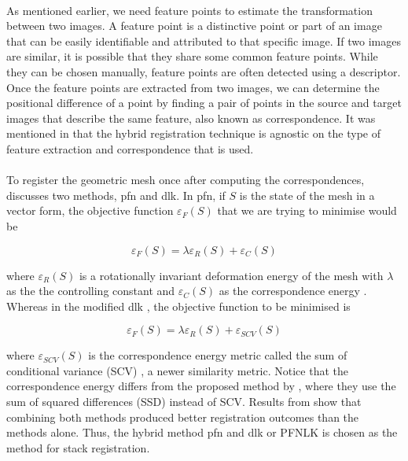 \documentclass[12pt,oneside]{report}
\begin{document}
\paragraph{}
As mentioned earlier, we need feature points to estimate the transformation between two images. A feature point is a distinctive point or part of an image that can be easily identifiable and attributed to that specific image. If two images are similar, it is possible that they share some common feature points. While they can be chosen manually, feature points are often detected using a descriptor. Once the feature points are extracted from two images, we can determine the positional difference of a point by finding a pair of points in the source and target images that describe the same feature, also known as correspondence. It was mentioned in \cite{du_robust_2015} that the hybrid registration technique is agnostic on the type of feature extraction and correspondence that is used.

\paragraph{}
To register the geometric mesh once after computing the correspondences, \cite{du_robust_2015} discusses two methods, \acrshort{pfn} and \acrshort{dlk}. In \acrshort{pfn}, if $S$ is the state of the mesh in a vector form, the objective function $\varepsilon_F (S)$ that we are trying to minimise would be

\begin{equation}
    \varepsilon_F (S) = \lambda \varepsilon_R (S) + \varepsilon_C (S)
\end{equation}

where $\varepsilon_R (S)$ is a rotationally invariant deformation energy of the mesh with $\lambda$ as the the controlling constant and $\varepsilon_C (S)$ as the correspondence energy \cite{du_robust_2015, pilet_fast_2008}. Whereas in the modified \acrshort{dlk} \cite{zhu_fast_2009}, the objective function to be minimised is

\begin{equation}
    \varepsilon_F (S) = \lambda \varepsilon_R (S) + \varepsilon_{SCV} (S)
\end{equation}

where $\varepsilon_{SCV} (S)$ is the correspondence energy metric called the sum of conditional variance (SCV) \cite{pickering_new_2009}, a newer similarity metric. Notice that the correspondence energy differs from the proposed method by \cite{zhu_fast_2009}, where they use the sum of squared differences (SSD) instead of SCV. Results from \cite{du_robust_2015} show that combining both methods produced better registration outcomes than the methods alone. Thus, the hybrid method \acrshort{pfn} and \acrshort{dlk} or PFNLK is chosen as the method for stack registration.
\end{document}
